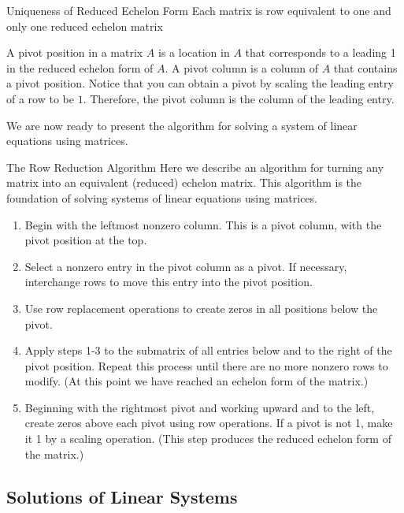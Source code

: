 \begin{theorem}{Uniqueness of Reduced Echelon Form}
    Each matrix is row equivalent to one and only one reduced echelon matrix
\end{theorem}

A pivot position in a matrix $A$ is a location in $A$ that corresponds to a leading 1 in the reduced echelon form of $A$. A pivot column is a column of $A$ that contains a pivot position. Notice that you can obtain a pivot by scaling the leading entry of a row to be $1$. Therefore, the pivot column is the column of the leading entry.

We are now ready to present the algorithm for solving a system of linear equations using matrices.

\begin{custombox}{The Row Reduction Algorithm}
    Here we describe an algorithm for turning any matrix into an equivalent
    (reduced) echelon matrix. This algorithm is the foundation of solving systems of linear equations using matrices.

    \begin{enumerate}
        \item Begin with the leftmost nonzero column. This is a pivot column, with the pivot position at the top.
        \item Select a nonzero entry in the pivot column as a pivot. If necessary, interchange rows to move this entry into the pivot position.
        \item Use row replacement operations to create zeros in all positions below the pivot.
        \item Apply steps 1-3 to the submatrix of all entries below and to the right of the pivot position. Repeat this process until there are no more nonzero rows to modify. (At this point we have reached an echelon form of the matrix.)
        \item Beginning with the rightmost pivot and working upward and to the left, create zeros above each pivot using row operations. If a pivot is not 1, make it 1 by a scaling operation. (This step produces the reduced echelon form of the matrix.)
    \end{enumerate}

\end{custombox}

\subsection*{Solutions of Linear Systems}

